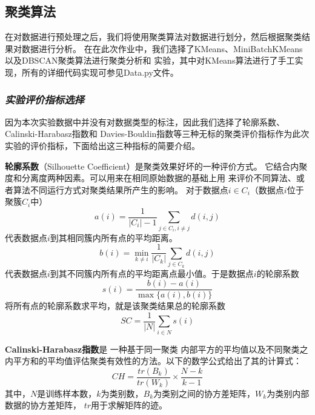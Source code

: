 \documentclass{acm_proc_article-sp}
\begin{document}

\subsection{\textsf{聚类算法}}

在对数据进行预处理之后，我们将使用聚类算法对数据进行划分，然后根据聚类结果对数据进行分析。
在在此次作业中，我们选择了KMeans、MiniBatchKMeans以及DBSCAN聚类算法进行聚类分析和
实验，其中对KMeans算法进行了手工实现，所有的详细代码实现可参见Data.py文件。

\subsubsection{\textit{实验评价指标选择}}

因为本次实验数据中并没有对数据类型的标注，因此我们选择了轮廓系数、Calinski-Harabasz指数和
Davies-Bouldin指数等三种无标的聚类评价指标作为此次实验的评价指标，下面给出这三种指标的简要介绍。

\textbf{轮廓系数}（Silhouette Coefficient）是聚类效果好坏的一种评价方式。
它结合内聚度和分离度两种因素。可以用来在相同原始数据的基础上用
来评价不同算法、或者算法不同运行方式对聚类结果所产生的影响。
对于数据点$i \in C_i$（数据点$i$位于聚簇$C_i$中）
$$a(i) = \frac{1}{|C_i| - 1} \sum_{j \in C_i, i \neq j} d(i, j)$$
代表数据点$i$到其相同簇内所有点的平均距离。
$$b(i) = \min_{k \neq i} \frac{1}{|C_k|} \sum_{j \in C_k} d(i, j)$$
代表数据点$i$到其不同簇内所有点的平均距离点最小值。于是数据点$i$的轮廓系数
$$s(i) = \frac{b(i) - a(i)}{\max\{a(i),b(i)\}}$$
将所有点的轮廓系数求平均，就是该聚类结果总的轮廓系数
$$\mathit{SC}=\frac{1}{|N|} \sum_{i\in N} s(i)$$

\textbf{Calinski-Harabasz指数}是%
一种基于同一聚类
内部平方的平均值以及不同聚类之内平方和的平均值评估聚类有效性的方法。以下的数学公式给出了其的计算式：
$$\mathit{CH} = \frac{ tr(B_k) }{ tr(W_k) } \times \frac{ N-k }{ k-1 }$$
其中，$N$是训练样本数，$k$为类别数，$B_k$为类别之间的协方差矩阵，$W_k$为类别内部数据的协方差矩阵，
$tr$用于求解矩阵的迹。
\end{document}
